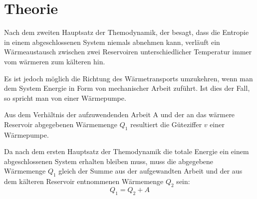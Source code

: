 \section{Theorie \cite{sample}}
\label{sec:Theorie}
  Nach dem zweiten Hauptsatz der Themodynamik, der besagt, dass die Entropie in
  einem abgeschlossenen System niemals abnehmen kann, verläuft ein Wärmeaustausch
  zwischen zwei Reservoiren unterschiedlicher Temperatur immer vom wärmeren zum
  kälteren hin.

  Es ist jedoch möglich die Richtung des Wärmetransports umzukehren, wenn man
  dem System Energie in Form von mechanischer Arbeit zuführt. Ist dies der Fall,
  so spricht man von einer Wärmepumpe.

  Aus dem Verhältnis der aufzuwendenden Arbeit A und der an das wärmere Reservoir
  abgegebenen Wärmemenge $Q_1$ resultiert die Güteziffer $v$ einer Wärmepumpe.

  Da nach dem ersten Hauptsatz der Themodynamik die totale Energie ein einem
  abgeschlossenen System erhalten bleiben muss, muss die abgegebene Wärmemenge
  $Q_1$ gleich der Summe aus der aufgewandten Arbeit und der aus dem kälteren
  Reservoir entnommenen Wärmemenge $Q_2$ sein:
  \begin{equation}
    Q_1 = Q_2 + A
  \end{equation}
